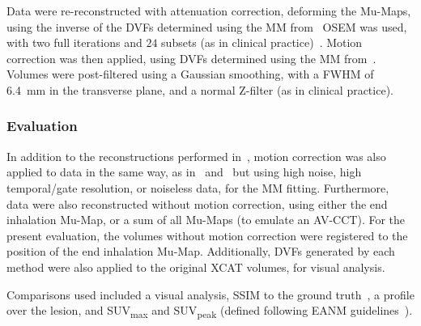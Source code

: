                 Data were re-reconstructed with attenuation correction, deforming the \glspl{Mu-Map}, using the inverse of the \glspl{DVF} determined using the \gls{MM} from~ \gls{OSEM} was used, with two full iterations and $24$ subsets (as in clinical practice)~\parencite{Hudson1994}. Motion correction was then applied, using \glspl{DVF} determined using the \gls{MM} from~. Volumes were post-filtered using a Gaussian smoothing, with a \gls{FWHM} of \SI{6.4}{\milli\metre} in the transverse plane, and a normal Z-filter (as in clinical practice).
            
            \subsubsection{Evaluation} \label{sec:pet_ct_motion_correction_exploiting_motion_models_fit_on_coarsely_gated_data_applied_to_finely_gated_data_methods_evaluation}
                In addition to the reconstructions performed in~, motion correction was also applied to data in the same way, as in~ and~ but using high noise, high temporal/gate resolution, or noiseless data, for the \gls{MM} fitting. Furthermore, data were also reconstructed without motion correction, using either the end inhalation \gls{Mu-Map}, or a sum of all \glspl{Mu-Map} (to emulate an \gls{AV-CCT}). For the present evaluation, the volumes without motion correction were registered to the position of the end inhalation \gls{Mu-Map}. Additionally, \glspl{DVF} generated by each method were also applied to the original \gls{XCAT} volumes, for visual analysis.
                
                Comparisons used included a visual analysis, \gls{SSIM} to the ground truth~\parencite{Wang2009MeanMeasures}, a profile over the lesion, and \gls{SUV}\textsubscript{max} and \gls{SUV}\textsubscript{peak} (defined following \gls{EANM} guidelines~\parencite{Boellaard2015FDG2.0}).
        
